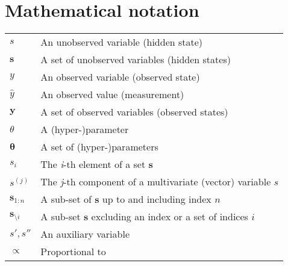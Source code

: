 

\section*{Mathematical notation}
\begin{table}[H]
  \raggedright
  \begin{tabularx}{\textwidth}{l X}
    $s$                        & An unobserved variable (hidden state)                                                                 \\
    $\bm{s}$                   & A set of unobserved variables (hidden states)                                                         \\
    $y$                        & An observed variable (observed state)                                                                 \\
    $\hat{y}$                  & An observed value (measurement)                                                                       \\
    $\bm{y}$                   & A set of observed variables (observed states)                                                         \\
    $\theta$                   & A (hyper-)parameter                                                                                   \\
    $\bm{\theta}$              & A set of (hyper-)parameters                                                                           \\
    $s_i$                      & The \emph{i}-th element of a set $\bm{s}$                                                             \\
    $s^{(j)}$                  & The \emph{j}-th component of a multivariate (vector) variable $s$                                     \\
    $\bm{s}_{1:n}$             & A sub-set of $\bm{s}$ up to and including index $n$                                                   \\
    $\bm{s}_{\setminus i}$     & A sub-set $\bm{s}$ excluding an index or a set of indices $i$                                         \\
    $s', s''$                  & An auxiliary variable                                                                                 \\
    $\propto$                  & Proportional to                                                                                       \\

\end{tabularx}
\end{table}
